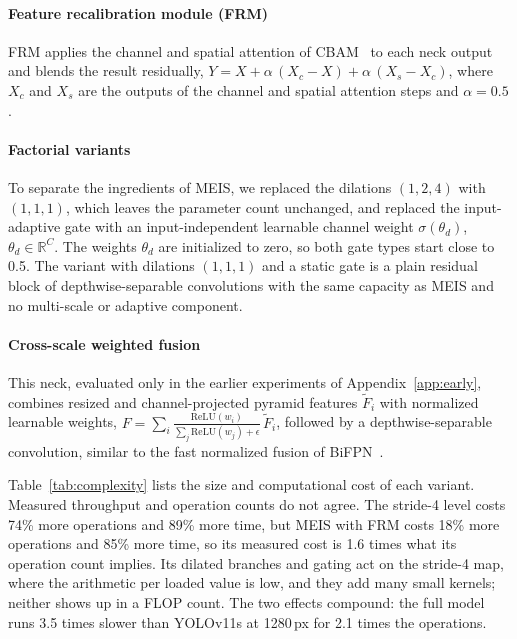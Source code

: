 \documentclass[preprint,12pt]{elsarticle}
\begin{document}
\paragraph{Feature recalibration module (FRM)}
FRM applies the channel and spatial attention of CBAM~\cite{cbam} to each neck
output and blends the result residually,
$Y = X + \alpha\,(X_c - X) + \alpha\,(X_s - X_c)$, where $X_c$ and $X_s$ are the
outputs of the channel and spatial attention steps and $\alpha=0.5$.

\paragraph{Factorial variants}
To separate the ingredients of MEIS, we replaced the dilations $(1,2,4)$ with
$(1,1,1)$, which leaves the parameter count unchanged, and replaced the
input-adaptive gate with an input-independent learnable channel weight
$\sigma(\theta_d)$, $\theta_d\in\mathbb{R}^C$. The weights $\theta_d$ are
initialized to zero, so both gate types start close to 0.5. The variant with
dilations $(1,1,1)$ and a static gate is a plain residual block of
depthwise-separable convolutions with the same capacity as MEIS and no multi-scale
or adaptive component.

\paragraph{Cross-scale weighted fusion}
This neck, evaluated only in the earlier experiments of Appendix~\ref{app:early},
combines resized and channel-projected pyramid features $\tilde F_i$ with
normalized learnable weights,
$F = \sum_i \frac{\mathrm{ReLU}(w_i)}{\sum_j \mathrm{ReLU}(w_j)+\epsilon}\,\tilde F_i$,
followed by a depthwise-separable convolution, similar to the fast normalized
fusion of BiFPN~\cite{efficientdet}.

Table~\ref{tab:complexity} lists the size and computational cost of each variant.
Measured throughput and operation counts do not agree. The stride-4 level costs
74\% more operations and 89\% more time, but MEIS with FRM costs 18\% more
operations and 85\% more time, so its measured cost is 1.6 times what its
operation count implies. Its dilated branches and gating act on the stride-4 map,
where the arithmetic per loaded value is low, and they add many small kernels;
neither shows up in a FLOP count. The two effects compound: the full model runs
3.5 times slower than YOLOv11s at 1280\,px for 2.1 times the operations.
\end{document}
